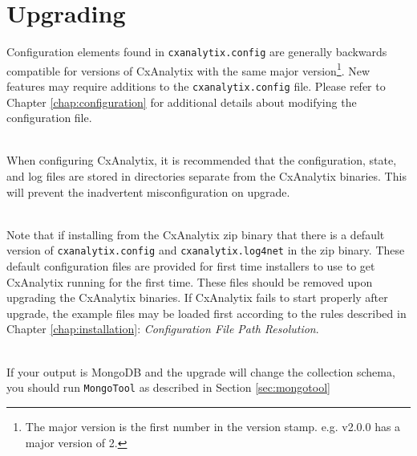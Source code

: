 \section{Upgrading}

Configuration elements found in \texttt{cxanalytix.config} are generally backwards compatible for versions
of CxAnalytix with the same major version\footnote{The major version is the first 
number in the version stamp.  e.g. v2.0.0 has a major version of 2.}.  New features may require additions
to the \texttt{cxanalytix.config} file. Please refer to Chapter \ref{chap:configuration} for additional details
about modifying the configuration file.


\noindent\\When configuring CxAnalytix, it is recommended that the configuration, state, and log files are stored
in directories separate from the CxAnalytix binaries.  This will prevent the inadvertent misconfiguration on upgrade.


\noindent\\Note that if installing from the CxAnalytix zip binary that there is a default version of \texttt{cxanalytix.config}
and \texttt{cxanalytix.log4net} in the zip binary.  These default configuration files are provided for first time installers to
use to get CxAnalytix running for the first time.  These files should be removed upon upgrading the CxAnalytix binaries.  If
CxAnalytix fails to start properly after upgrade, the example files may be loaded first according to the rules described in
Chapter \ref{chap:installation}: \textit{Configuration File Path Resolution}.

\noindent\\If your output is MongoDB and the upgrade will change the collection schema, you should run \texttt{MongoTool} as
described in Section \ref{sec:mongotool}